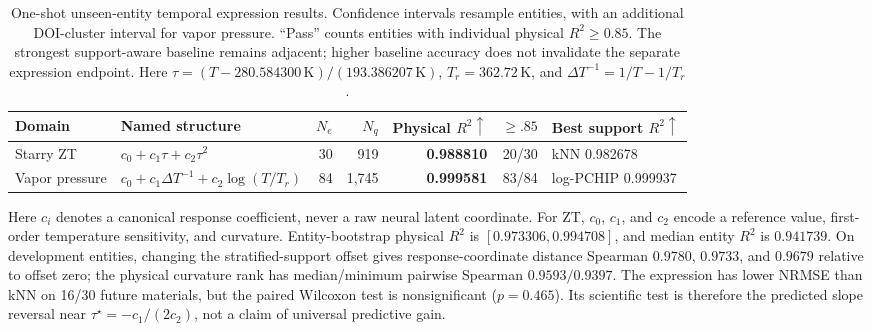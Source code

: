 \begin{table}[t]
  \centering
  \small
  \caption{One-shot unseen-entity temporal expression results.  Confidence
  intervals resample entities, with an additional DOI-cluster interval for
  vapor pressure.  ``Pass'' counts entities with individual physical
  $R^2\geq0.85$.  The strongest support-aware baseline remains adjacent; higher
  baseline accuracy does not invalidate the separate expression endpoint.
  Here $\tau=(T-280.584300\,\mathrm{K})/(193.386207\,\mathrm{K})$,
  $T_r=362.72\,\mathrm{K}$, and $\Delta T^{-1}=1/T-1/T_r$.}
  \label{tab:temporal-expression}
  \setlength{\tabcolsep}{4pt}
  \begin{tabular}{@{}llrrrrl@{}}
    \toprule
    Domain & Named structure & $N_e$ & $N_q$ & Physical $R^2\uparrow$ & $\geq.85$ & Best support $R^2\uparrow$ \\
    \midrule
    Starry ZT
      & $c_0+c_1\tau+c_2\tau^2$
      & 30 & 919 & \textbf{0.988810} & 20/30 & kNN 0.982678 \\
    Vapor pressure
      & $c_0+c_1\Delta T^{-1}+c_2\log(T/T_r)$
      & 84 & 1,745 & \textbf{0.999581} & 83/84 & log-PCHIP 0.999937 \\
    \bottomrule
  \end{tabular}
\end{table}

Here $c_i$ denotes a canonical response coefficient, never a raw neural latent
coordinate.  For ZT, $c_0$, $c_1$, and $c_2$ encode a reference value,
first-order
temperature sensitivity, and curvature.  Entity-bootstrap physical $R^2$ is
$[0.973306,0.994708]$, and median entity $R^2$ is $0.941739$.  On development
entities, changing the stratified-support offset gives response-coordinate
distance Spearman $0.9780$, $0.9733$, and $0.9679$ relative to offset zero; the
physical curvature rank has median/minimum pairwise Spearman
$0.9593/0.9397$.  The expression has lower NRMSE than kNN on 16/30 future
materials, but the paired Wilcoxon test is nonsignificant ($p=0.465$).  Its
scientific test is therefore the predicted slope reversal near
$\tau^\star=-c_1/(2c_2)$, not a claim of universal predictive gain.

